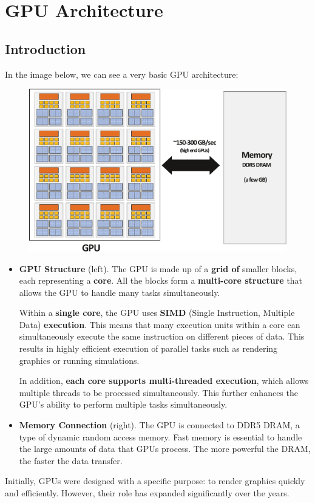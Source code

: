 \section{GPU Architecture}

\subsection{Introduction}

In the image below, we can see a very basic GPU architecture:
\begin{figure}[!htp]
    \centering
    \includegraphics[width=.9\textwidth]{img/gpu-architecture-into-1.pdf}
\end{figure}

\begin{itemize}
    \item \textbf{GPU Structure} (left). The GPU is made up of a \textbf{grid of} smaller blocks, each representing a \textbf{core}. All the blocks form a \textbf{multi-core structure} that allows the GPU to handle many tasks simultaneously.
    
    Within a \textbf{single core}, the GPU uses \textbf{SIMD} (Single Instruction, Multiple Data) \textbf{execution}. This means that many execution units within a core can simultaneously execute the same instruction on different pieces of data. This results in highly efficient execution of parallel tasks such as rendering graphics or running simulations.

    In addition, \textbf{each core supports multi-threaded execution}, which allows multiple threads to be processed simultaneously. This further enhances the GPU's ability to perform multiple tasks simultaneously.


    \item \textbf{Memory Connection} (right). The GPU is connected to DDR5 DRAM, a type of dynamic random access memory. Fast memory is essential to handle the large amounts of data that GPUs process. The more powerful the DRAM, the faster the data transfer.
\end{itemize}
Initially, GPUs were designed with a specific purpose: to render graphics quickly and efficiently. However, their role has expanded significantly over the years.

